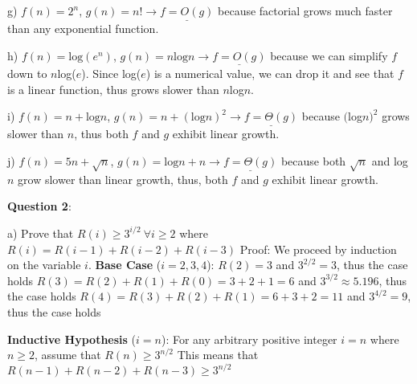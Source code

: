 \documentclass{article} %
\newcommand{\question}[2][]{\begin{flushleft}
        \textbf{Question #1}: \textit{#2}

\end{flushleft}}
\begin{document}
    \vspace{5pt}

    g) $f(n) = 2^n$, $g(n) = n! \rightarrow \underline{f = O(g)}$
    because factorial grows much faster than any exponential 
    \tabto{28pt} function.

    \vspace{5pt}

    h) $f(n) = \text{log}(e^n)$, $g(n) = n \text{log}n \rightarrow \underline{f = O(g)}$ 
    because we can simplify $f$ down to $n$log($e$). Since
    \tabto{28pt} log($e$) is a numerical value, we can drop it and see that $f$ is a linear function, thus grows
    \tabto{28pt} slower than $n$log$n$.

    \vspace{5pt}

    i) $f(n) = n + \text{log}n$, $g(n) = n + (\text{log}n)^2 \rightarrow \underline{f = \Theta(g)}$
    because $($log$n)^2$ grows slower than $n$, thus 
    \tabto{26pt} both $f$ and $g$ exhibit linear growth.

    \vspace{5pt}

    j) $f(n) = 5n + \sqrt{n}$, $g(n) = \text{log}n + n \rightarrow \underline{f = \Theta(g)}$
    because both $\sqrt{n}$ and log$n$ grow slower than 
    \tabto{26pt} linear growth, thus, both $f$ and $g$ exhibit linear growth.

    \newpage

    \question[2]{}
    
    a) Prove that $R(i) \geq  3^{i/2}\ \forall i \geq 2$ where $R(i) = R(i - 1) + R(i - 2) + R(i - 3) $
    \vspace{5pt}
    \tabto{28pt} Proof:
    \tabto{28pt} We proceed by induction on the variable $i$.
    \tabto{28pt} \textbf{Base Case} ($i = 2, 3, 4$):
    \tabto{28pt} $R(2) = 3$ and $3^{2/2} = 3$, thus the case holds
    \tabto{28pt} $R(3) = R(2) + R(1) + R(0) = 3+2+1=6$ and $3^{3/2} \approx 5.196$, thus the case holds
    \tabto{28pt} $R(4) = R(3) + R(2) + R(1) = 6+3+2=11$ and $3^{4/2} = 9$, thus the case holds
    
    \vspace{5pt}

    \tabto{28pt} \textbf{Inductive Hypothesis} ($i = n$): 
    \tabto{28pt} For any arbitrary positive integer $i = n$ where $n \geq 2$, assume that $R(n) \geq 3^{n/2}$ 
    \tabto{28pt} This means that $R(n - 1) + R(n - 2) + R(n - 3) \geq 3^{n/2}$

    \vspace{5pt}
\end{document}

